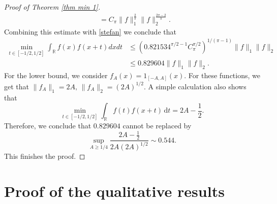 \documentclass[11pt, reqno]{amsart}
\newcommand{\mmd}{ \mathrm{d}}
\numberwithin{equation}{section}
\newcommand{\R}{{\mathbb R}}
\begin{document}
\begin{proof}[Proof of Theorem \ref{thm min 1}]
\begin{align*}
    &=C_{\pi}\|f\|^{\frac{2}{\pi}}_1\|f\|^{\frac{2\pi-2}{\pi}}_2.
    \end{align*}
Combining this estimate with \eqref{stefan} we conclude that
\begin{align*}
\min_{t\in[{-1/2,1/2}]}\int_{\R}f(x)f(x+t)dxdt &\leq (0.821534^{\pi/2-1}C^{\pi/2}_{\pi})^{1/(\pi-1)}\|f\|_1\|f\|_2\\
&\le 0.829604\|f\|_1\|f\|_2.
\end{align*}
For the lower bound, we consider $f_A(x)=1_{[-A,A]}(x)$. For these functions, we get that $\|f_A\|_1 = 2A, \, \|f_A\|_2 = (2A)^{1/2}.$ A simple calculation also shows that 
\[
\min_{t \in [-1/2,1/2]} \int_{\R} f(t) f(x+t) \, \mmd t = 2A - \frac{1}{2}. 
\]
Therefore, we conclude that $0.829604$ cannot be replaced by 
\[
\sup_{A \ge 1/4} \frac{2A - \frac{1}{2}}{2A(2A)^{1/2}} \sim 0.544.
\]
This finishes the proof.
\end{proof}





\section{Proof of the qualitative results} 
\end{document}
